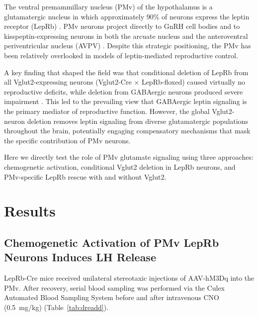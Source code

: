 \documentclass[11pt]{article}
\begin{document}
The ventral premammillary nucleus (PMv) of the hypothalamus is a glutamatergic nucleus in which approximately 90\% of neurons express the leptin receptor (LepRb) \citep{scott2009leptin, donato2011leptin}. PMv neurons project directly to GnRH cell bodies and to kisspeptin-expressing neurons in both the arcuate nucleus and the anteroventral periventricular nucleus (AVPV) \citep{ross2018pmv}. Despite this strategic positioning, the PMv has been relatively overlooked in models of leptin-mediated reproductive control.

A key finding that shaped the field was that conditional deletion of LepRb from all Vglut2-expressing neurons (Vglut2-Cre $\times$ LepRb-floxed) caused virtually no reproductive deficits, while deletion from GABAergic neurons produced severe impairment \citep{vong2011leptin, zuure2013leptin}. This led to the prevailing view that GABAergic leptin signaling is the primary mediator of reproductive function. However, the global Vglut2-neuron deletion removes leptin signaling from diverse glutamatergic populations throughout the brain, potentially engaging compensatory mechanisms that mask the specific contribution of PMv neurons.

Here we directly test the role of PMv glutamate signaling using three approaches: chemogenetic activation, conditional Vglut2 deletion in LepRb neurons, and PMv-specific LepRb rescue with and without Vglut2.

\section{Results}

\subsection{Chemogenetic Activation of PMv LepRb Neurons Induces LH Release}

LepRb-Cre mice received unilateral stereotaxic injections of AAV-hM3Dq into the PMv. After recovery, serial blood sampling was performed via the Culex Automated Blood Sampling System before and after intravenous CNO (0.5~mg/kg) (Table~\ref{tab:dreadd}).
\end{document}
